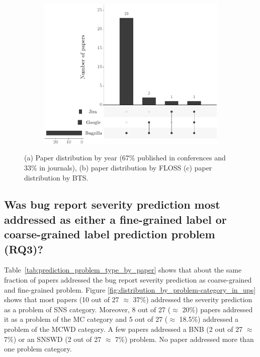 \begin{figure}[!htp]
\begin{subfigure}{.49\textwidth}
    \includegraphics[width=\textwidth]{figures/distribution-by-bts-in-ups.pdf}
    \caption{}
    \label{fig:distribution_by_bts} 
  \end{subfigure}
  \caption{(a) Paper distribution by year (67\% published in conferences and 33\% in journals), (b) paper distribution by FLOSS (c) paper distribution by BTS.}
  \label{fig:rq1_classification}
\end{figure}

\subsection{Was bug report severity prediction most addressed as either a fine-grained label  or coarse-grained label prediction problem (RQ3)?}\label{subsec:rq3_result}

Table~\ref{tab:prediction_problem_type_by_paper} shows that about the same fraction of papers addressed the bug report severity prediction as coarse-grained and fine-grained problem. Figure \ref{fig:distribution_by_problem-category_in_ups} shows that most papers  (10 out of 27 $\approx$ 37\%)  addressed the severity prediction as a problem of SNS category. Moreover, 8 out of 27 ($\approx$ 20\%) papers addressed it as a problem of the MC category and 5 out of 27 ($\approx$ 18.5\%) addressed a problem of the MCWD category. A few papers addressed a BNB (2 out of 27 $\approx$ 7\%) or an SNSWD (2 out of 27 $\approx$ 7\%) problem. No paper addressed more than one problem category.

